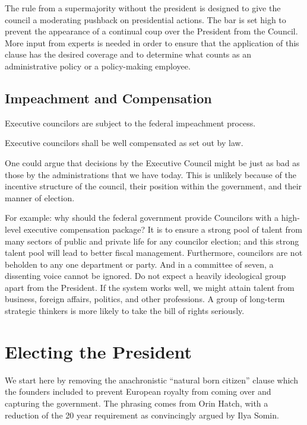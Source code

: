 \documentclass{article}
\begin{document}
The rule from a supermajority without the president is designed to give the council a moderating pushback on presidential actions. The bar is set high to prevent the appearance of a continual coup over the President from the Council. More input from experts is needed in order to ensure that the application of this clause has the desired coverage and to determine what counts as an administrative policy or a policy-making employee.

\subsection{Impeachment and Compensation}

\begin{quoting}
Executive councilors are subject to the federal impeachment process.

Executive councilors shall be well compensated as set out by law.
\end{quoting}

One could argue that decisions by the Executive Council might be just as bad as those by the administrations that we have today. This is unlikely because of the incentive structure of the council, their position within the government, and their manner of election.

For example: why should the federal government provide Councilors with a high-level executive compensation package? It is to ensure a strong pool of talent from many sectors of public and private life for any councilor election; and this strong talent pool will lead to better fiscal management. Furthermore, councilors are not beholden to any one department or party. And in a committee of seven, a dissenting voice cannot be ignored. Do not expect a heavily ideological group apart from the President. If the system works well, we might attain talent from business, foreign affairs, politics, and other professions. A group of long-term strategic thinkers is more likely to take the bill of rights seriously.

\section{Electing the President}

We start here by removing the anachronistic “natural born citizen” clause which the founders included to prevent European royalty from coming over and capturing the government. The phrasing comes from Orin Hatch\cite{Somin_Hatch}, with a reduction of the 20 year requirement as convincingly argued by Ilya Somin\cite{Somin_NBC}.
\end{document}
